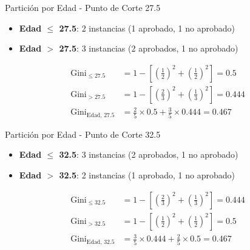\documentclass{beamer}
\begin{document}
\begin{frame}{Partición por Edad - Punto de Corte 27.5}
    \begin{itemize}
        \item \textbf{Edad $\leq$ 27.5}: 2 instancias (1 aprobado, 1 no aprobado)
        \item \textbf{Edad $>$ 27.5}: 3 instancias (2 aprobados, 1 no aprobado)
    \end{itemize}
    
    \vspace{0.5em}
    
    \begin{align*}
        \mathrm{Gini}_{\leq 27.5} &= 1 - \left[\left(\tfrac{1}{2}\right)^2 + \left(\tfrac{1}{2}\right)^2\right] = 0.5 \\
        \mathrm{Gini}_{> 27.5} &= 1 - \left[\left(\tfrac{2}{3}\right)^2 + \left(\tfrac{1}{3}\right)^2\right] = 0.444 \\
        \mathrm{Gini}_{\text{Edad, 27.5}} &= \tfrac{2}{5}\times0.5 + \tfrac{3}{5}\times0.444 = 0.467
    \end{align*}
\end{frame}

\begin{frame}{Partición por Edad - Punto de Corte 32.5}
    \begin{itemize}
        \item \textbf{Edad $\leq$ 32.5}: 3 instancias (2 aprobados, 1 no aprobado)
        \item \textbf{Edad $>$ 32.5}: 2 instancias (1 aprobado, 1 no aprobado)
    \end{itemize}
    
    \vspace{0.5em}
    
    \begin{align*}
        \mathrm{Gini}_{\leq 32.5} &= 1 - \left[\left(\tfrac{2}{3}\right)^2 + \left(\tfrac{1}{3}\right)^2\right] = 0.444 \\
        \mathrm{Gini}_{> 32.5} &= 1 - \left[\left(\tfrac{1}{2}\right)^2 + \left(\tfrac{1}{2}\right)^2\right] = 0.5 \\
        \mathrm{Gini}_{\text{Edad, 32.5}} &= \tfrac{3}{5}\times0.444 + \tfrac{2}{5}\times0.5 = 0.467
    \end{align*}
\end{frame}
\end{document}
